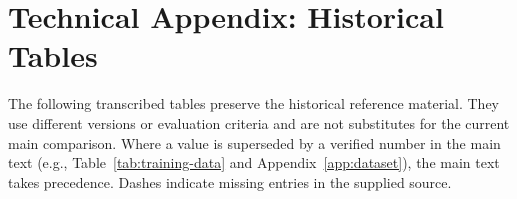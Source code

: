 \documentclass[letterpaper]{article} %
\begin{document}
\FloatBarrier
\section{Technical Appendix: Historical Tables}
\label{app:historical}
The following transcribed tables preserve the historical reference material. They use different versions or evaluation criteria and are not substitutes for the current main comparison. Where a value is superseded by a verified number in the main text (e.g., Table~\ref{tab:training-data} and Appendix~\ref{app:dataset}), the main text takes precedence. Dashes indicate missing entries in the supplied source.

\FloatBarrier
\end{document}
